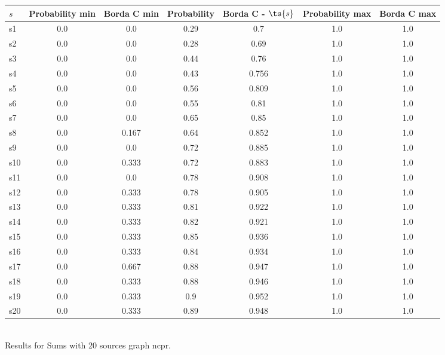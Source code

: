 \documentclass{article}
\begin{document}
\noindent\begin{tabular}{|l|c|c|c|c|c|c|}
\hline
$s$& Probability min & Borda C min & Probability & Borda C - $\ts{s}$ & Probability max & Borda C max\\
\hline
s1 &0.0 & 0.0 & 0.29 & 0.7 & 1.0 & 1.0\\
\hline
s2 &0.0 & 0.0 & 0.28 & 0.69 & 1.0 & 1.0\\
\hline
s3 &0.0 & 0.0 & 0.44 & 0.76 & 1.0 & 1.0\\
\hline
s4 &0.0 & 0.0 & 0.43 & 0.756 & 1.0 & 1.0\\
\hline
s5 &0.0 & 0.0 & 0.56 & 0.809 & 1.0 & 1.0\\
\hline
s6 &0.0 & 0.0 & 0.55 & 0.81 & 1.0 & 1.0\\
\hline
s7 &0.0 & 0.0 & 0.65 & 0.85 & 1.0 & 1.0\\
\hline
s8 &0.0 & 0.167 & 0.64 & 0.852 & 1.0 & 1.0\\
\hline
s9 &0.0 & 0.0 & 0.72 & 0.885 & 1.0 & 1.0\\
\hline
s10 &0.0 & 0.333 & 0.72 & 0.883 & 1.0 & 1.0\\
\hline
s11 &0.0 & 0.0 & 0.78 & 0.908 & 1.0 & 1.0\\
\hline
s12 &0.0 & 0.333 & 0.78 & 0.905 & 1.0 & 1.0\\
\hline
s13 &0.0 & 0.333 & 0.81 & 0.922 & 1.0 & 1.0\\
\hline
s14 &0.0 & 0.333 & 0.82 & 0.921 & 1.0 & 1.0\\
\hline
s15 &0.0 & 0.333 & 0.85 & 0.936 & 1.0 & 1.0\\
\hline
s16 &0.0 & 0.333 & 0.84 & 0.934 & 1.0 & 1.0\\
\hline
s17 &0.0 & 0.667 & 0.88 & 0.947 & 1.0 & 1.0\\
\hline
s18 &0.0 & 0.333 & 0.88 & 0.946 & 1.0 & 1.0\\
\hline
s19 &0.0 & 0.333 & 0.9 & 0.952 & 1.0 & 1.0\\
\hline
s20 &0.0 & 0.333 & 0.89 & 0.948 & 1.0 & 1.0\\
\hline
\end{tabular}\\

\noindent Results for Sums with 20 sources graph ncpr.
\end{document}
